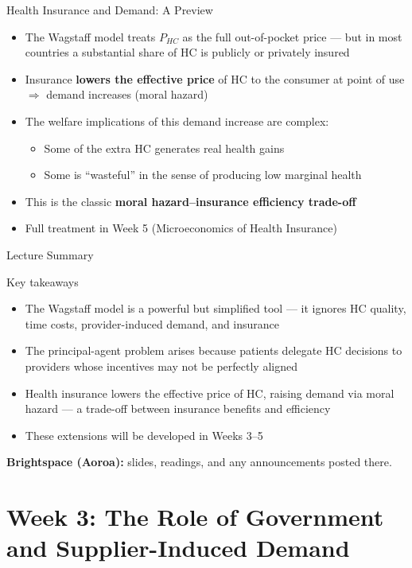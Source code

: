\documentclass[aspectratio=169, 12pt]{beamer}
\newcommand{\summaryside}[1]{%
  \begin{frame}{Lecture Summary}
    \begin{exampleblock}{Key takeaways}
      \begin{itemize}#1\end{itemize}
    \end{exampleblock}
    \vspace{0.5em}
    {\footnotesize\textcolor{OtagoGold}{\textbf{Brightspace (Aoroa):}} slides, readings, and any announcements posted there.}
  \end{frame}}
\begin{document}
\begin{frame}{Health Insurance and Demand: A Preview}
  \begin{itemize}
    \item The Wagstaff model treats $P_{HC}$ as the full out-of-pocket price --- but in most
          countries a substantial share of HC is publicly or privately insured
    \item Insurance \textbf{lowers the effective price} of HC to the consumer at point of use
          $\Rightarrow$ demand increases (moral hazard)
    \item The welfare implications of this demand increase are complex:
    \begin{itemize}
      \item Some of the extra HC generates real health gains
      \item Some is ``wasteful'' in the sense of producing low marginal health
    \end{itemize}
    \item This is the classic \textbf{moral hazard--insurance efficiency trade-off}
    \item Full treatment in Week 5 (Microeconomics of Health Insurance)
  \end{itemize}
\end{frame}

\summaryside{
  \item The Wagstaff model is a powerful but simplified tool --- it ignores HC quality, time costs, provider-induced demand, and insurance
  \item The principal-agent problem arises because patients delegate HC decisions to providers whose incentives may not be perfectly aligned
  \item Health insurance lowers the effective price of HC, raising demand via moral hazard --- a trade-off between insurance benefits and efficiency
  \item These extensions will be developed in Weeks 3--5
}



\section{Week 3: The Role of Government and Supplier-Induced Demand}
\end{document}
